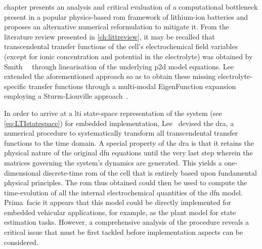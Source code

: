 \newpage
{}  chapter  presents  an  analysis  and  critical  evaluation
of  a computational  bottleneck  present in  a  popular physics-based  \gls{rom}
framework  of  lithium-ion  batteries  and  proposes  an  alternative  numerical
reformulation  to  mitigate   it.  From  the  literature   review  presented  in
\cref{ch:littreview},   it  may   be  recalled   that  transcendental   transfer
functions   of  the   cell's   electrochemical  field   variables  (except   for
ionic  concentration  and   potential  in  the  electrolyte)   was  obtained  by
Smith~\etal~\cite{Smith2007} through  linearisation of the  underlying \gls{p2d}
model equations.  Lee~\etal~\cite{Lee2012a,Lee2012} extended  the aforementioned
approach so as  to obtain these missing  electrolyte-specific transfer functions
through  a  multi-modal  EigenFunction  expansion  employing  a  Sturm-Liouville
approach~\cite{Pryce1993}.


In order to arrive at a  \gls{lti} state-space representation of the system (see
\cref{eq:LTIstatespace})  for embedded  implementation, Lee~\etal{}  devised the
\gls{dra}, a numerical procedure  to systematically transform all transcendental
transfer functions  to the time domain. A special property of  the \gls{dra} is
that it  retains the physical nature  of the original \gls{dfn}  equations until
the very  last step  wherein the  matrices governing  the system's  dynamics are
generated. This  yields a  one-dimensional discrete-time  \gls{rom} of  the cell
that is entirely based upon  fundamental physical principles. The \gls{rom} thus
obtained could  then be used to  compute the time-evolution of  all the internal
electrochemical quantities of  the \gls{dfn} model. Prima~facie  it appears that
this model  could be directly  implemented for embedded  vehicular applications,
for  example,  as  the  plant  model for  state  estimation  tasks.  However,  a
comprehensive analysis  of the procedure reveals  a critical issue that  must be
first tackled before implementation aspects can be considered.

